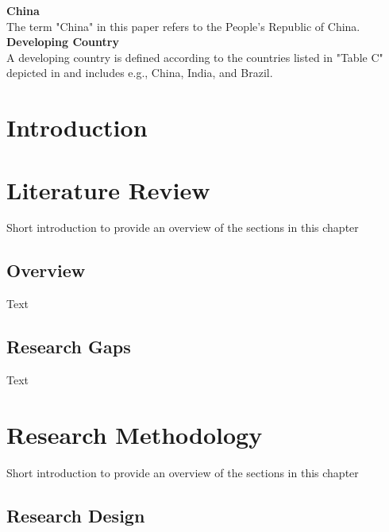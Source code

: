 \documentclass[11pt,a4paper,oneside]{report}
\begin{document}
\textbf{China}\\
The term "China" in this paper refers to the People's Republic of China.\\ 

\textbf{Developing Country}\\
A developing country is defined according to the countries listed in "Table C" depicted in  and includes e.g., China, India, and Brazil.\\ 




\chapter{Introduction}


\blindtext





\chapter{Literature Review}
\label{chapter_theoretical_background}


Short introduction to provide an overview of the sections in this chapter

\section{Overview}

Text



\section{Research Gaps}

Text




\chapter{Research Methodology}
\label{chapter_research_methodology}

Short introduction to provide an overview of the sections in this chapter

\section{Research Design}
\label{chapter_research_design}
\end{document}
